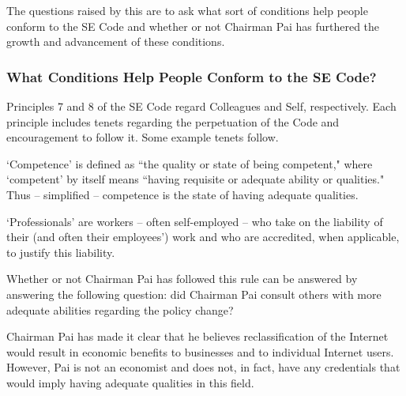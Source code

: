 \documentclass[12pt]{article}
\begin{document}
\begin{multicols}{2}
	The questions raised by this are to ask what sort of conditions help people conform to the SE Code and whether or not Chairman Pai has furthered the growth and advancement of these conditions.
  
  \subsubsection{What Conditions Help People Conform to the SE Code?}
  Principles 7 and 8 of the SE Code regard Colleagues and Self, respectively. Each principle includes tenets regarding the perpetuation of the Code and encouragement to follow it. Some example tenets follow.
  
  
  `Competence' is defined as ``the quality or state of being competent," where `competent' by itself means ``having requisite or adequate ability or qualities."\cite{webster} Thus -- simplified -- competence is the state of having adequate qualities.
  
  `Professionals' are workers -- often self-employed -- who take on the liability of their (and often their employees') work and who are accredited, when applicable, to justify this liability.\cite{cpe-300}
  
  
  Whether or not Chairman Pai has followed this rule can be answered by answering the following question: did Chairman Pai consult others with more adequate abilities regarding the policy change?
  
  Chairman Pai has made it clear that he believes reclassification of the Internet would result in economic benefits to businesses and to individual Internet users.\cite{pbs-pai-makes-case} However, Pai is not an economist and does not, in fact, have any credentials that would imply having adequate qualities in this field.\cite{pai-fcc-page}
  

\end{multicols}
\end{document}
